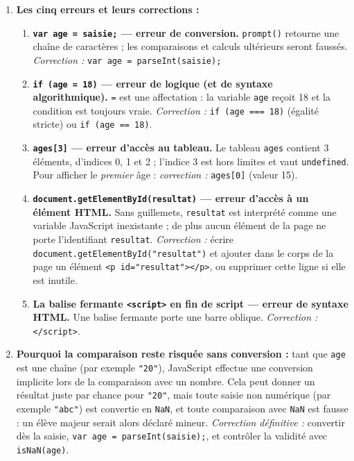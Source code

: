 \documentclass[11pt]{article}
\newcounter{popsec}
\newcounter{popsub}
\newcommand{\courssub}[1]{%
  \stepcounter{popsub}%
  \par\vspace{9pt}\noindent{\popxbold\fontsize{11.5}{13}\selectfont\color{popink}{\color{poporange}\thepopsec.\thepopsub}\hspace{6pt}#1}\par\nopagebreak\vspace{4pt}
}
\begin{document}
\courssub{Je me prépare au Probatoire}

\begin{corrige}
\begin{enumerate}
\item \textbf{Les cinq erreurs et leurs corrections :}
\begin{enumerate}
\item \textbf{\texttt{var age = saisie;} — erreur de conversion.} \texttt{prompt()} retourne une chaîne de caractères ; les comparaisons et calculs ultérieurs seront faussés. \emph{Correction :} \texttt{var age = parseInt(saisie);}
\item \textbf{\texttt{if (age = 18)} — erreur de logique (et de syntaxe algorithmique).} \texttt{=} est une affectation : la variable \texttt{age} reçoit 18 et la condition est toujours vraie. \emph{Correction :} \texttt{if (age === 18)} (égalité stricte) ou \texttt{if (age == 18)}.
\item \textbf{\texttt{ages[3]} — erreur d'accès au tableau.} Le tableau \texttt{ages} contient 3 éléments, d'indices 0, 1 et 2 ; l'indice 3 est hors limites et vaut \texttt{undefined}. Pour afficher le \emph{premier} âge : \emph{correction :} \texttt{ages[0]} (valeur 15).
\item \textbf{\texttt{document.getElementById(resultat)} — erreur d'accès à un élément HTML.} Sans guillemets, \texttt{resultat} est interprété comme une variable JavaScript inexistante ; de plus aucun élément de la page ne porte l'identifiant \texttt{resultat}. \emph{Correction :} écrire \texttt{document.getElementById("resultat")} et ajouter dans le corps de la page un élément \texttt{<p id="resultat"></p>}, ou supprimer cette ligne si elle est inutile.
\item \textbf{La balise fermante \texttt{<script>} en fin de script — erreur de syntaxe HTML.} Une balise fermante porte une barre oblique. \emph{Correction :} \texttt{</script>}.
\end{enumerate}
\item \textbf{Pourquoi la comparaison reste risquée sans conversion :} tant que \texttt{age} est une chaîne (par exemple \texttt{"20"}), JavaScript effectue une conversion implicite lors de la comparaison avec un nombre. Cela peut donner un résultat juste par chance pour \texttt{"20"}, mais toute saisie non numérique (par exemple \texttt{"abc"}) est convertie en \texttt{NaN}, et toute comparaison avec \texttt{NaN} est fausse : un élève majeur serait alors déclaré mineur. \emph{Correction définitive :} convertir dès la saisie, \texttt{var age = parseInt(saisie);}, et contrôler la validité avec \texttt{isNaN(age)}.

\end{enumerate}
\end{corrige}
\end{document}
